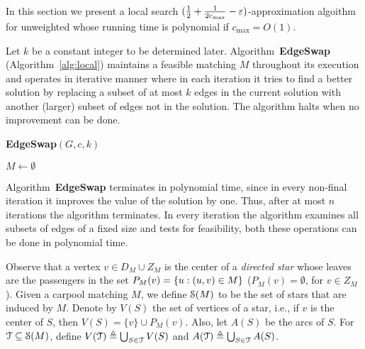 
In this section we present a local search $(\frac{1}{2} + \frac{1}{2c_{\max}}
- \varepsilon)$-approximation algoithm for unweighted \carpool whose running
time is polynomial if $c_{\max} = O(1)$.

Let $k$ be a constant integer to be determined later.
Algorithm~\textbf{EdgeSwap} (Algorithm~\ref{alg:local}) maintains a
feasible matching $M$ throughout its execution and operates in
iterative manner where in each iteration it tries to find a better
solution by replacing a subset of at most $k$ edges in the current
solution with another (larger) subset of edges not in the solution.
The algorithm halts when no improvement can be done. 

\begin{algorithm}
\caption{\textbf{EdgeSwap}$(G,c,k)$}
\label{alg:local}
\begin{small}
$M \leftarrow \emptyset$								\\
\end{small}
\end{algorithm}

Algorithm~\textbf{EdgeSwap} terminates in polynomial time, since in
every non-final iteration it improves the value of the solution by
one.  Thus, after at most $n$ iterations the algorithm terminates.  In
every iteration the algorithm examines all subsets of edges of a fixed
size and tests for feasibility, both these operations can be done in
polynomial time.

Observe that a vertex $v \in D_M \cup Z_M$ is the center of
a \emph{directed star} whose leaves are the passengers in the set
$P_M(v) = \left\{ u : (u,v) \in M \right\}$
($P_M(v) = \emptyset$, for $v \in Z_M$).
%
Given a carpool matching $M$, we define $\mathcal{S}(M)$ to be the set of
stars that are induced by $M$.  Denote by $V(S)$ the set of vertices
of a star, i.e., if $v$ is the center of $S$, then $V(S) = \{v\} \cup
P_M(v)$.  Also, let $A(S)$ be the arcs of $S$.  For
$\mathcal{T} \subseteq \mathcal{S}(M)$, define
$V(\mathcal{T}) \triangleq \bigcup_{S \in \mathcal{T}} V(S)$ and
$A(\mathcal{T}) \triangleq \bigcup_{S \in \mathcal{T}} A(S)$.

